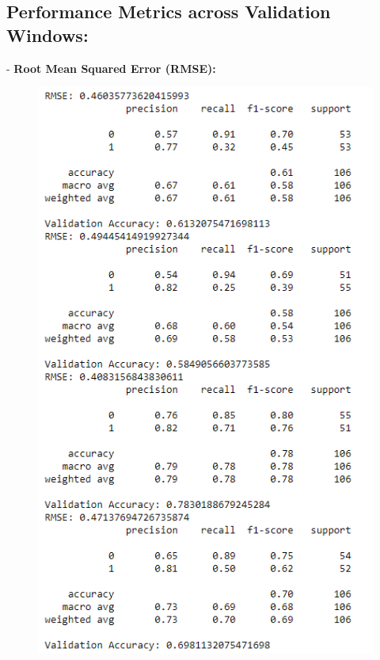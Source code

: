 \subsection{Performance Metrics across Validation Windows:}

-	\textbf{Root Mean Squared Error (RMSE): }

\begin{figure}[H]
\centering
\includegraphics[scale=0.85]{fig2.jpg}
\end{figure}

